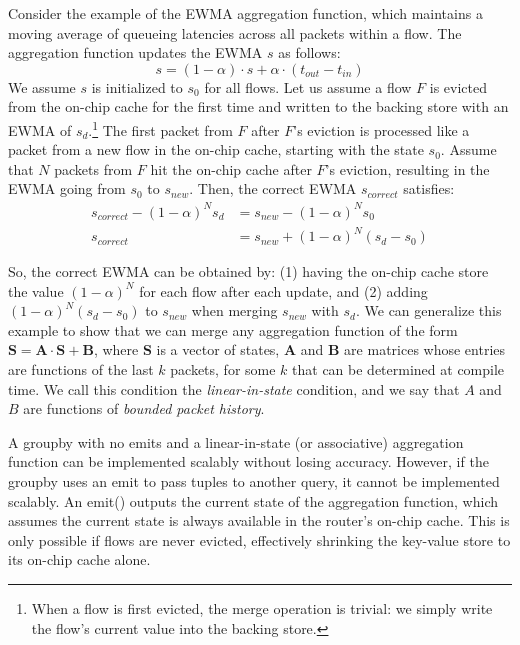 Consider the example of the EWMA aggregation function, which maintains a moving
average of queueing latencies across all packets within a flow. The aggregation
function updates the EWMA $s$ as follows:
\[ s = (1 - \alpha) \cdot s + \alpha \cdot (t_{out} - t_{in}) \]
We assume $s$ is initialized to $s_0$ for all flows. Let us assume a flow $F$ is
evicted from the on-chip cache for the first time and written to the backing
store with an EWMA of $s_d$.\footnote{When a flow is first evicted, the merge
operation is trivial: we simply write the flow's current value into the backing
store.} The first packet from $F$ after $F$'s eviction  is processed like a
packet from a new flow in the on-chip cache, starting with the state $s_0$.
Assume that $N$ packets from $F$ hit the on-chip cache after $F$'s eviction,
resulting in the EWMA going from $s_0$ to $s_{new}$.  Then, the correct EWMA
$s_{correct}$ satisfies:
\begin{align*}
s_{correct} - (1-\alpha)^N s_d &= s_{new} - (1-\alpha)^N s_0 \\
s_{correct} &= s_{new} + (1-\alpha)^N(s_d - s_0)
\end{align*}

So, the correct EWMA can be obtained by: (1) having the on-chip cache store the
value $(1-\alpha)^N$ for each flow after each update, and (2) adding
$(1-\alpha)^N(s_d - s_0)$ to $s_{new}$ when merging $s_{new}$ with $s_d$. We
can generalize this example to show that we can merge any aggregation function
of the form $\boldsymbol{S} = \boldsymbol{A} \cdot \boldsymbol{S} +
\boldsymbol{B}$, where $\boldsymbol{S}$ is a vector of states, $\boldsymbol{A}$
and $\boldsymbol{B}$ are matrices whose entries are functions of the last $k$
packets, for some $k$ that can be determined at compile time. We call this
condition the {\em linear-in-state} condition, and we say that $A$ and $B$ are
functions of {\em bounded packet history}.

A {\ct groupby} with no {\ct emit}s and a linear-in-state (or associative)
aggregation function can be implemented scalably without losing accuracy.
However, if the {\ct groupby} uses an {\ct emit} to pass tuples to another
query, it cannot be implemented scalably. An {\ct emit()} outputs the current state
of the aggregation function, which assumes the current state is always
available in the router's on-chip cache. This is only possible if flows are
never evicted, effectively shrinking the key-value store to its on-chip cache
alone.

